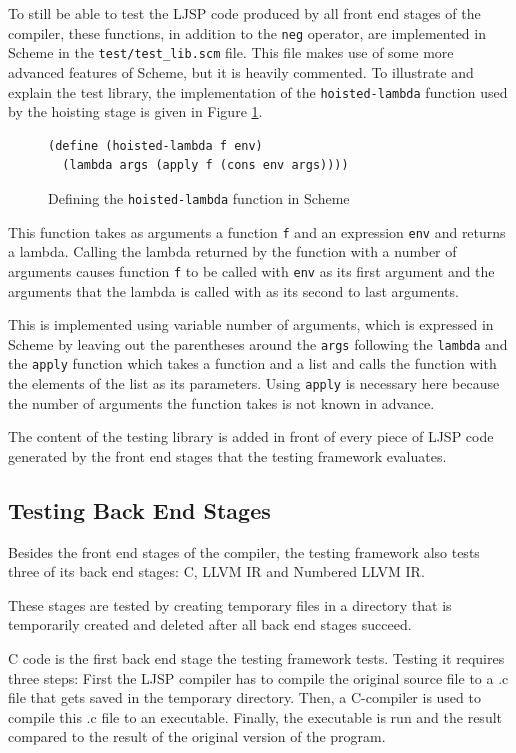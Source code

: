 \documentclass[11pt]{report}
\begin{document}
To still be able to test the LJSP code produced by all front end stages of the compiler, these functions, in addition to the \texttt{neg} operator, are implemented in Scheme in the \texttt{test/test_lib.scm} file. This file makes use of some more advanced features of Scheme, but it is heavily commented. To illustrate and explain the test library, the implementation of the \texttt{hoisted-lambda} function used by the hoisting stage is given in Figure \ref{testing1}.

\begin{figure}[ht]
\begin{lstlisting}
(define (hoisted-lambda f env) 
  (lambda args (apply f (cons env args))))
\end{lstlisting}
\caption{Defining the \texttt{hoisted-lambda} function in Scheme}
\label{testing1}
\end{figure}

This function takes as arguments a function \texttt{f} and an expression \texttt{env} and returns a lambda. Calling the lambda returned by the function with a number of arguments causes function \texttt{f} to be called with \texttt{env} as its first argument and the arguments that the lambda is called with as its second to last arguments.

This is implemented using variable number of arguments, which is expressed in Scheme by leaving out the parentheses around the \texttt{args} following the \texttt{lambda} and the \texttt{apply} function which takes a function and a list and calls the function with the elements of the list as its parameters. Using \texttt{apply} is necessary here because the number of arguments the function takes is not known in advance.

The content of the testing library is added in front of every piece of LJSP code generated by the front end stages that the testing framework evaluates.

\subsection{Testing Back End Stages}

Besides the front end stages of the compiler, the testing framework also tests three of its back end stages: C, LLVM IR and Numbered LLVM IR.

These stages are tested by creating temporary files in a directory that is temporarily created and deleted after all back end stages succeed.

C code is the first back end stage the testing framework tests. Testing it requires three steps: First the LJSP compiler has to compile the original source file to a .c file that gets saved in the temporary directory. Then, a C-compiler is used to compile this .c file to an executable. Finally, the executable is run and the result compared to the result of the original version of the program.
\end{document}
